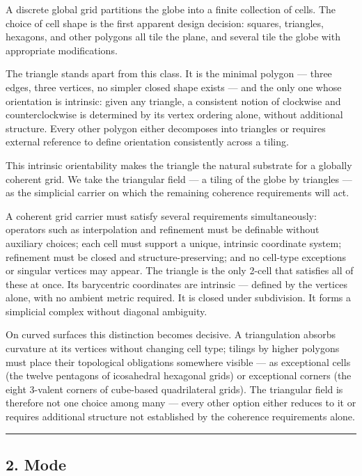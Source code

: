 \documentclass[
  11pt,
  a4paper,
]{article}
\begin{document}
A discrete global grid partitions the globe into a finite collection of
cells. The choice of cell shape is the first apparent design decision:
squares, triangles, hexagons, and other polygons all tile the plane, and
several tile the globe with appropriate modifications.

The triangle stands apart from this class. It is the minimal polygon ---
three edges, three vertices, no simpler closed shape exists --- and the
only one whose orientation is intrinsic: given any triangle, a
consistent notion of clockwise and counterclockwise is determined by its
vertex ordering alone, without additional structure. Every other polygon
either decomposes into triangles or requires external reference to
define orientation consistently across a tiling.

This intrinsic orientability makes the triangle the natural substrate
for a globally coherent grid. We take the triangular field --- a tiling
of the globe by triangles --- as the simplicial carrier on which the
remaining coherence requirements will act.

A coherent grid carrier must satisfy several requirements
simultaneously: operators such as interpolation and refinement must be
definable without auxiliary choices; each cell must support a unique,
intrinsic coordinate system; refinement must be closed and
structure-preserving; and no cell-type exceptions or singular vertices
may appear. The triangle is the only 2-cell that satisfies all of these
at once. Its barycentric coordinates are intrinsic --- defined by the
vertices alone, with no ambient metric required. It is closed under
subdivision. It forms a simplicial complex without diagonal ambiguity.

On curved surfaces this distinction becomes decisive. A triangulation
absorbs curvature at its vertices without changing cell type; tilings by
higher polygons must place their topological obligations somewhere
visible --- as exceptional cells (the twelve pentagons of icosahedral
hexagonal grids) or exceptional corners (the eight 3-valent corners of
cube-based quadrilateral grids). The triangular field is therefore not
one choice among many --- every other option either reduces to it or
requires additional structure not established by the coherence
requirements alone.

\begin{center}\rule{0.5\linewidth}{0.5pt}\end{center}

\subsection{2. Mode}\label{mode}
\end{document}
